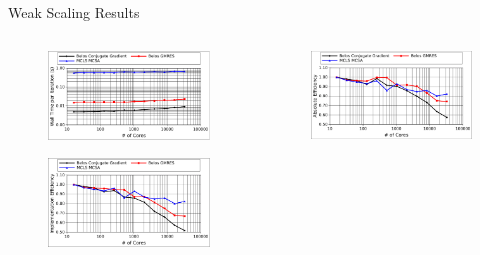 \documentclass{beamer}
\begin{document}
\begin{frame}{Weak Scaling Results}

  \begin{columns}
    \begin{column}{0.5\textwidth}

      \begin{figure}[htpb!]
        \begin{center}
          \includegraphics[width=2.3in]{titan_pure_weak_time.pdf}
        \end{center}
      \end{figure}

      \begin{figure}[htpb!]
        \begin{center}
          \includegraphics[width=2.3in]{titan_weak_implementation.pdf}
        \end{center}
      \end{figure}

    \end{column}

    \begin{column}{0.5\textwidth}

      \begin{figure}[htpb!]
        \begin{center}
          \includegraphics[width=2.3in]{titan_weak_absolute.pdf}
        \end{center}
      \end{figure}


\end{column}
\end{columns}
\end{frame}
\end{document}
